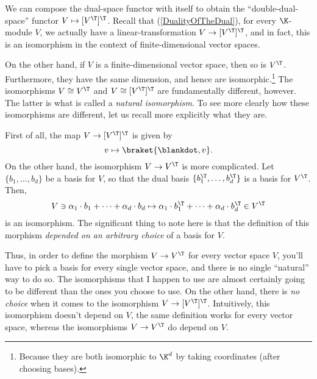 We can compose the dual-space functor with itself to obtain the ``double-dual-space'' functor $V\mapsto [V^{\T}]^{\T}$.  Recall that (\cref{DualityOfTheDual}), for every $\K$-module $V$, we actually have a linear-transformation $V\rightarrow [V^{\T}]^{\T}$, and in fact, this is an isomorphism in the context of finite-dimensional vector spaces.

On the other hand, if $V$ is a finite-dimensional vector space, then so is $V^{\T}$.  Furthermore, they have the same dimension, and hence are isomorphic.\footnote{Because they are both isomorphic to $\K ^d$ by taking coordinates (after choosing bases).}  The isomorphisms $V\cong V^{\T}$ and $V\cong [V^{\T}]^{\T}$ are fundamentally different, however.  The latter is what is called a \emph{natural isomorphism}.  To see more clearly how these isomorphisms are different, let us recall more explicitly what they are.

First of all, the map $V\rightarrow [V^{\T}]^{\T}$ is given by
\begin{equation}
	v\mapsto \braket{\blankdot ,v}.
\end{equation}
On the other hand, the isomorphism $V\rightarrow V^{\T}$ is more complicated.  Let $\{ b_1,\ldots ,b_d\}$ be a basis for $V$, so that the dual basis $\{ b_1^{\T},\ldots ,b_d^{\T}\}$ is a basis for $V^{\T}$.  Then,
\begin{equation}
	V\ni \alpha _1\cdot b_1+\cdots +\alpha _d\cdot b_d\mapsto \alpha _1\cdot b_1^{\T}+\cdots +\alpha _d\cdot b_d^{\T}\in V^{\T}
\end{equation}
is an isomorphism.  The significant thing to note here is that the definition of this morphism \emph{depended on an arbitrary choice} of a basis for $V$.

Thus, in order to define the morphism $V\rightarrow V^{\T}$ for every vector space $V$, you'll have to pick a basis for every single vector space, and there is no single ``natural'' way to do so.  The isomorphisms that I happen to use are almost certainly going to be different than the ones you choose to use.  On the other hand, there is \emph{no choice} when it comes to the isomorphism $V\rightarrow [V^{\T}]^{\T}$.  Intuitively, this isomorphism doesn't depend on $V$, the same definition works for every vector space, whereas the isomorphisms $V\rightarrow V^{\T}$ do depend on $V$.

